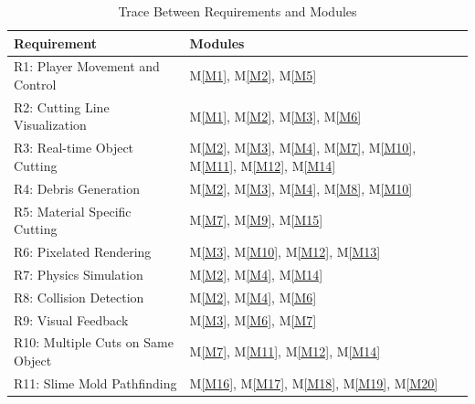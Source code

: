 \documentclass[12pt, titlepage]{article}
\newcommand{\mref}[1]{M\ref{#1}}
\begin{document}
\begin{table}[H]
\centering
\caption{Trace Between Requirements and Modules}
\begin{tabular}{|p{}| p{}|}
\hline
\textbf{Requirement} & \textbf{Modules}\\
\hline
R1: Player Movement and Control & \mref{M1}, \mref{M2}, \mref{M5}\\
\hline
R2: Cutting Line Visualization & \mref{M1}, \mref{M2}, \mref{M3}, \mref{M6}\\
\hline
R3: Real-time Object Cutting & \mref{M2}, \mref{M3}, \mref{M4}, \mref{M7}, \mref{M10}, \mref{M11}, \mref{M12}, \mref{M14}\\
\hline
R4: Debris Generation & \mref{M2}, \mref{M3}, \mref{M4}, \mref{M8}, \mref{M10}\\
\hline
R5: Material Specific Cutting & \mref{M7}, \mref{M9}, \mref{M15}\\
\hline
R6: Pixelated Rendering & \mref{M3}, \mref{M10}, \mref{M12}, \mref{M13}\\
\hline
R7: Physics Simulation & \mref{M2}, \mref{M4}, \mref{M14}\\
\hline
R8: Collision Detection & \mref{M2}, \mref{M4}, \mref{M6}\\
\hline
R9: Visual Feedback & \mref{M3}, \mref{M6}, \mref{M7}\\
\hline
R10: Multiple Cuts on Same Object & \mref{M7}, \mref{M11}, \mref{M12}, \mref{M14}\\
\hline
R11: Slime Mold Pathfinding & \mref{M16}, \mref{M17}, \mref{M18}, \mref{M19}, \mref{M20}\\
\hline
\end{tabular}
\label{TblRT}
\end{table}
\end{document}

